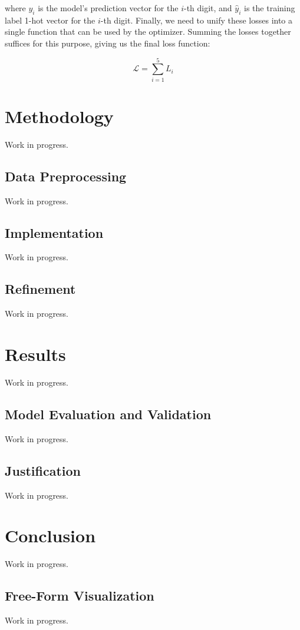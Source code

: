 \documentclass[12pt]{article}
\begin{document}
where $y_i$ is the model's prediction vector for the $i$-th digit, and $\hat{y}_i$ is the training label 1-hot vector for the $i$-th digit.
Finally, we need to unify these losses into a single function that can be used by the optimizer.
Summing the losses together suffices for this purpose, giving us the final loss function:

\begin{equation}
	\mathcal{L} = \sum_{i=1}^5 L_i
\end{equation}

\section{Methodology}
Work in progress.

\subsection{Data Preprocessing}
Work in progress.

\subsection{Implementation}
Work in progress.

\subsection{Refinement}
Work in progress.

\section{Results}
Work in progress.

\subsection{Model Evaluation and Validation}
Work in progress.

\subsection{Justification}
Work in progress.

\section{Conclusion}
Work in progress.

\subsection{Free-Form Visualization}
Work in progress.
\end{document}
